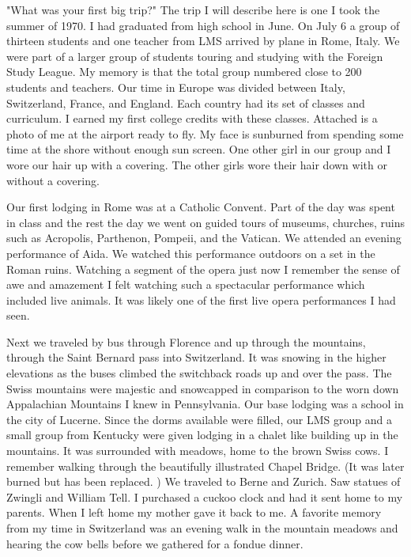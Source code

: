 "What was your first big trip?"
The trip I will describe here is one I took the summer of 1970.
I had graduated from high school in June.
On July 6 a group of thirteen students and one teacher from LMS arrived by plane in Rome, Italy.
We were part of a larger group of students touring and studying with the Foreign Study League.
My memory is that the total group numbered close to 200 students and teachers.
Our time in Europe was divided between Italy, Switzerland, France, and England.
Each country had its set of classes and curriculum.
I earned my first college credits with these classes.
Attached is a photo of me at the airport ready to fly.
My face is sunburned from spending some time at the shore without enough sun screen.
One other girl in our group and I wore our hair up with a covering.
The other girls wore their hair down with or without a covering.

Our first lodging in Rome was at a Catholic Convent.
Part of the day was spent in class and the rest the day we went on guided tours of museums, churches, ruins such as Acropolis, Parthenon, Pompeii, and the Vatican.
We attended an evening performance of Aida.
We watched this performance outdoors on a set in the Roman ruins.
Watching a segment of the opera just now I remember the sense of awe and amazement I felt watching such a spectacular performance which included live animals.
It was likely one of the first live opera performances I had seen.

Next we traveled by bus through Florence and up through the mountains, through the Saint Bernard pass into Switzerland.
It was snowing in the higher elevations as the buses climbed the switchback roads up and over the pass.
The Swiss mountains were majestic and snowcapped in comparison to the worn down Appalachian Mountains I knew in Pennsylvania.
Our base lodging was a school in the city of Lucerne.
Since the dorms available were filled, our LMS group and a small group from Kentucky were given lodging in a chalet like building up in the mountains.
It was surrounded with meadows, home to the brown Swiss cows.
I remember walking through the beautifully illustrated Chapel Bridge.
(It was later burned but has been replaced.
) We traveled to Berne and Zurich.
Saw statues of Zwingli and William Tell.
I purchased a cuckoo clock and had it sent home to my parents.
When I left home my mother gave it back to me.
A favorite memory from my time in Switzerland was an evening walk in the mountain meadows and hearing the cow bells before we gathered for a fondue dinner.

